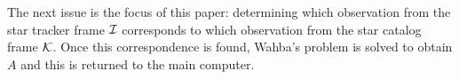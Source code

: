 The next issue is the focus of this paper: determining which observation from the star tracker frame $\mathcal{I}$
corresponds to which observation from the star catalog frame $\mathcal{K}$.
Once this correspondence is found, Wahba's problem is solved to obtain $A$ and this is returned to the main computer.
